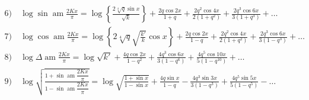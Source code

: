\documentclass{article}
\begin{document}
\[
\begin{gathered}
\text{6)}\quad\log\sin\operatorname{am}\frac{2Kx}{\pi}=\log\left\{\frac{2\sqrt[4]{q}\sin x}{\sqrt{k}}\right\}+\frac{2q\cos2x}{1+q}+\frac{2q^{2}\cos4x}{2(1+q^{2})}+\frac{2q^{3}\cos6x}{3(1+q^{3})}+\ldots\\[1.5ex]
\text{7)}\quad\log\cos\operatorname{am}\frac{2Kx}{\pi}=\log\left\{2\sqrt[4]{q}\sqrt{\frac{k'}{k}}\cos x\right\}+\frac{2q\cos2x}{1-q}+\frac{2q^{2}\cos4x}{2(1+q^{2})}+\frac{2q^{3}\cos6x}{3(1-q^{3})}+\ldots\\[1.5ex]
\text{8)}\quad\log\Delta\operatorname{am}\frac{2Kx}{\pi}=\log\sqrt{k'}+\frac{4q\cos2x}{1-q^{2}}+\frac{4q^{3}\cos6x}{3(1-q^{6})}+\frac{4q^{5}\cos10x}{5(1-q^{10})}+\ldots\\[1.5ex]
\text{9)}\quad\log\sqrt{\frac{1+\sin\operatorname{am}\dfrac{2Kx}{\pi}}{1-\sin\operatorname{am}\dfrac{2Kx}{\pi}}}=\log\sqrt{\frac{1+\sin x}{1-\sin x}}+\frac{4q\sin x}{1-q}-\frac{4q^{3}\sin3x}{3(1-q^{3})}+\frac{4q^{5}\sin5x}{5(1-q^{5})}-\ldots
\end{gathered}
\]
\end{document}
